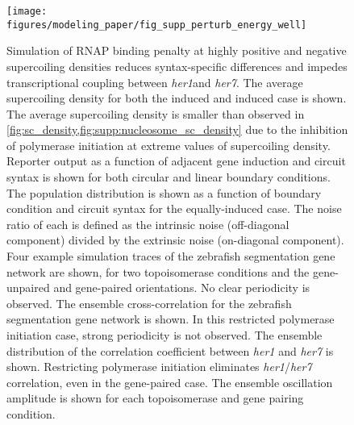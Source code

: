 \documentclass[11pt]{article}
\begin{document}
\begin{figure}[htbp]
    \centering
    {\texttt{[image: figures/modeling\_paper/fig\_supp\_perturb\_energy\_well]}
    \label{fig:supp:energy_well_sc_density}
    \label{fig:supp:energy_well_induction_sweep}
    \label{fig:supp:energy_well_joint_distribution}
    \label{fig:supp:energy_well_zinani_examples}
    \label{fig:supp:energy_well_zinani_crosscorr}
    \label{fig:supp:energy_well_zinani_correlation_coefficient}
    \label{fig:supp:energy_well_zinani_oscillation_amplitude}
    }
\end{figure}
\begin{figure}
    \ContinuedFloat
    \caption{ Simulation of RNAP binding penalty at highly positive and negative supercoiling densities reduces syntax-specific differences and impedes transcriptional coupling between \textit{her1}and \textit{her7}.
         The average supercoiling density for both the induced and induced case is shown. The average supercoiling density is smaller than observed in \cref{fig:sc_density,fig:supp:nucleosome_sc_density} due to the inhibition of polymerase initiation at extreme values of supercoiling density.
         Reporter output as a function of adjacent gene induction and circuit syntax is shown for both circular and linear boundary conditions.
         The population distribution is shown as a function of boundary condition and circuit syntax for the equally-induced case. The noise ratio of each is defined as the intrinsic noise (off-diagonal component) divided by the extrinsic noise (on-diagonal component).
         Four example simulation traces of the zebrafish segmentation gene network are shown, for two topoisomerase conditions and the gene-unpaired and gene-paired orientations. No clear periodicity is observed.
         The ensemble cross-correlation for the zebrafish segmentation gene network is shown. In this restricted polymerase initiation case, strong periodicity is not observed.
         The ensemble distribution of the correlation coefficient between \textit{her1} and \textit{her7} is shown. Restricting polymerase initiation eliminates \emph{her1}/\emph{her7} correlation, even in the gene-paired case.
         The ensemble oscillation amplitude is shown for each topoisomerase and gene pairing condition.
    }
    \label{fig:top:supp_perturb_energy_well}
\end{figure}
\end{document}
